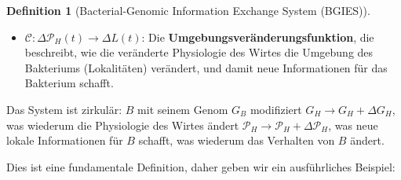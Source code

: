 \documentclass[a4paper,12pt]{article}
\theoremstyle{definition}
\newtheorem{definition}{Definition}
\begin{document}
\begin{definition}[Bacterial-Genomic Information Exchange System (BGIES)]
\begin{itemize}
    \item[-] $\mathcal{C}: \Delta \mathcal{P}_H(t) \to \Delta L(t)$: Die \textbf{Umgebungsveränderungsfunktion}, die beschreibt, wie die veränderte Physiologie des Wirtes die Umgebung des Bakteriums (Lokalitäten) verändert, und damit neue Informationen für das Bakterium schafft.
\end{itemize}

Das System ist zirkulär: $B$ mit seinem Genom $G_B$ modifiziert $G_H \to G_H + \Delta G_H$, was wiederum die Physiologie des Wirtes ändert $\mathcal{P}_H \to \mathcal{P}_H + \Delta \mathcal{P}_H$, was neue lokale Informationen für $B$ schafft, was wiederum das Verhalten von $B$ ändert.
\end{definition}

Dies ist eine fundamentale Definition, daher geben wir ein ausführliches Beispiel:
\end{document}
